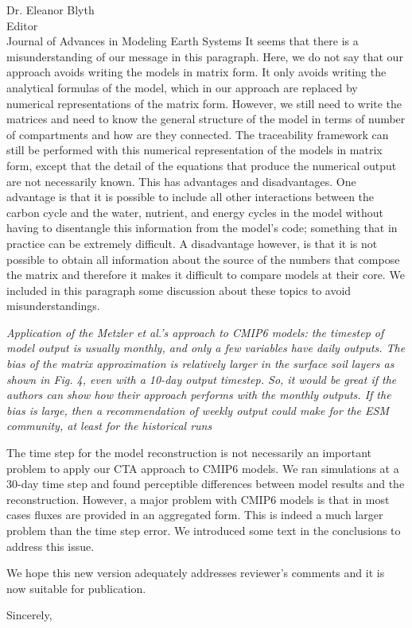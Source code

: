\documentclass[11pt]{bgcletter}
\begin{document}
\begin{letter}{Dr. Eleanor Blyth\\
 Editor \\ Journal of Advances in Modeling Earth Systems}
{\color{blue} It seems that there is a misunderstanding of our message in this paragraph. Here, we do not say that our approach avoids writing the models in matrix form. It only avoids writing the analytical formulas of the model, which in our approach are replaced by numerical representations of the matrix form. However, we still need to write the matrices and need to know the general structure of the model in terms of number of compartments and how are they connected. The traceability framework can still be performed with this numerical representation of the models in matrix form, except that the detail of the equations that produce the numerical output are not necessarily known. This has advantages and disadvantages. One advantage is that it is possible to include all other interactions between the carbon cycle and the water, nutrient, and energy cycles in the model without having to disentangle this information from the model's code; something that in practice can be extremely difficult. A disadvantage however, is that it is not possible to obtain all information about the source of the numbers that compose the matrix and therefore it makes it difficult to compare models at their core. We included in this paragraph some discussion about these topics to avoid misunderstandings. }

{\it Application of the Metzler et al.'s approach to CMIP6 models: the timestep of model output is usually monthly, and only a few variables have daily outputs. The bias of the matrix approximation is relatively larger in the surface soil layers as shown in Fig. 4, even with a 10-day output timestep. So, it would be great if the authors can show how their approach performs with the monthly outputs. If the bias is large, then a recommendation of weekly output could make for the ESM community, at least for the historical runs}

{\color{blue} The time step for the model reconstruction is not necessarily an important problem to apply our CTA approach to CMIP6 models. We ran simulations at a 30-day time step and found perceptible differences between model results and the reconstruction. However, a major problem with CMIP6 models is that in most cases fluxes are provided in an aggregated form. This is indeed a much larger problem than the time step error. We introduced some text in the conclusions to address this issue.}

\vspace{2em}
We hope this new version adequately addresses reviewer's comments and it is now suitable for publication.

\closing{Sincerely,}
 \end{letter}

 
\end{document}
